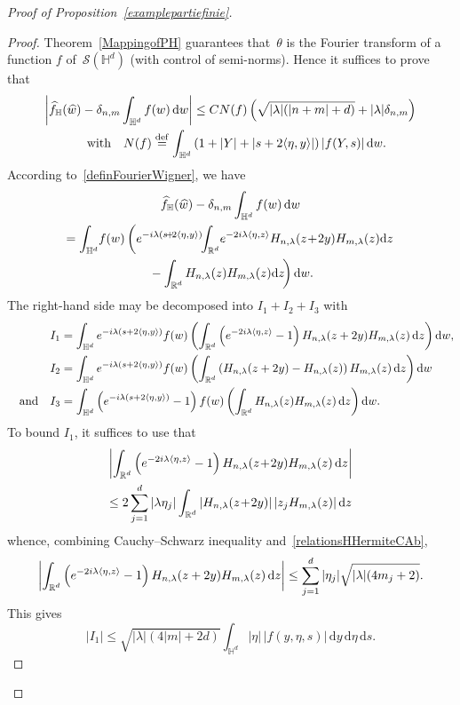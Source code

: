 \documentclass[AHL,Unicode,longabstracts]{cedram}
\let\wh=\widehat
\def\R{{\mathop{\mathbb R\kern 0pt}\nolimits}}
\newcommand*\bbH{\mathbb{H}}
\newcommand{\lam}{\lambda}
\newcommand{\wh}{\widehat}
\newcommand*\cS{\mathcal{S}}
\newcommand*\R{\mathbb{R}}
\newcommand*\bbH{\mathbb{H}}
\newcommand{\andf}{\quad\hbox{and}\quad}
\newcommand{\with}{\quad\hbox{with}\quad}
\newcommand*\eqdefa{\overset{\mathrm{def}}{=}}
\newcommand*{\dd}{\mathrm{d}}
\newcommand{\ds}{\dd s}
\newcommand{\dw}{\dd w}
\newcommand{\dy}{\dd y}
\newcommand{\dz}{\dd z}
\newcommand{\deta}{\dd \eta}
\begin{document}
\begin{proof}[Proof of Proposition~\ref{examplepartiefinie}]
\begin{proof}
Theorem~\ref{MappingofPH} guarantees that~$\theta$ is the Fourier transform of a function $f$ of~$\cS(\bbH^d)$ (with control of semi-norms). Hence it suffices to prove that
\begin{multline*}
\left|\wh f_\bbH(\wh w)-\delta_{n,m}\int_{\bbH^d} f(w)\,\dw\right| \leq CN(f) \left(\sqrt{|\lam|(|n+m|+d)}+|\lam|\delta_{n,m}\right)\\
\with N(f)\eqdefa \int_{\bbH^d} \left(1+|Y| +|s+2\langle \eta,y\rangle|\right) |f(Y,s)| \,\dw.
\end{multline*}
According to~\eqref{definFourierWigner}, we have
\begin{multline*}
\wh f_\bbH(\wh w)-\delta_{n,m}\int_{\bbH^d} f(w)\,\dw \\ =\int_{\bbH^d} \! f(w)\left(e^{-i\lam(s\!+\!2\langle\eta,y\rangle)}\!\!
\int_{\R^d}\!e^{-2i\lam\langle\eta,z\rangle} H_{n,\lam}(z\!+\!2y)H_{m,\lam}(z)\dz\right.\\
\left.{}-\int_{\R^d}H_{n,\lam}(z) H_{m,\lam}(z)\dz\!\right)\dw.
\end{multline*}
The right-hand side may be decomposed into $I_1+I_2+I_3$ with
\[
\begin{aligned}
I_1&=\int_{\bbH^d} e^{-i\lam(s+2\langle\eta,y\rangle)}f(w)
\left(\int_{\R^d} \left(e^{-2i\lam\langle\eta,z\rangle}-1\right)H_{n,\lam}(z+2y)H_{m,\lam}(z)\,\dz\right)\dw,\\
I_2&=\int_{\bbH^d} e^{-i\lam(s+2\langle\eta,y\rangle)}f(w)
\left(\int_{\R^d} \left(H_{n,\lam}(z+2y)-H_{n,\lam}(z)\right)H_{m,\lam}(z)\,\dz\right)\dw\\
\andf I_3&=\int_{\bbH^d} \left(e^{-i\lam(s+2\langle\eta,y\rangle)}-1\right)f(w)\left(\int_{\R^d} H_{n,\lam}(z)H_{m,\lam}(z)\,\dz\right)\dw.
\end{aligned}
\]
To bound $I_1$, it suffices to use that
\begin{multline*}
\left|\int_{\R^d} \left(e^{-2i\lam\langle\eta,z\rangle}-1\right)H_{n,\lam}(z\!+\!2y)H_{m,\lam}(z)\,\dz\right|\\
\leq 2\sum_{j=1}^d |\lam\eta_j| \int_{\R^d} |H_{n,\lam}(z\!+\!2y)|\,|z_j H_{m,\lam}(z)|\,\dz
\end{multline*}
whence, combining Cauchy--Schwarz inequality and~\eqref{relationsHHermiteCAb},
\[
\left|\int_{\R^d} \left(e^{-2i\lam\langle\eta,z\rangle}-1\right)H_{n,\lam}(z+2y)H_{m,\lam}(z)\,\dz\right|
\leq \sum_{j=1}^d |\eta_j| \sqrt{|\lam|(4m_j+2)}.
\]
This gives
\begin{equation}\label{eq:I1}
|I_1|\leq \sqrt{|\lam|(4|m|+2d)}\int_{\bbH^d} |\eta|\,|f(y,\eta,s)|\,\dy\,\deta\,\ds.

\end{equation}
\end{proof}
\end{proof}
\end{document}
